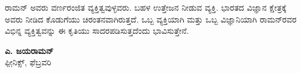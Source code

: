 ರಾಮನ್ ಅವರು ವರ್ಣರಂಜಿತ ವ್ಯಕ್ತಿತ್ವವುಳ್ಳವರು. ಬಹಳ ಉತ್ತೇಜನ ನೀಡುವ ವ್ಯಕ್ತಿ. ಭಾರತದ ವಿಜ್ಞಾನ ಕ್ಷೇತ್ರಕ್ಕೆ ಅವರು ನೀಡಿದ ಕೊಡುಗೆಯು ಚಿರಂತನವಾಗಿರುತ್ತದೆ. ಒಬ್ಬ ವ್ಯಕ್ತಿಯಾಗಿ ಮತ್ತು ಒಬ್ಬ ವಿಜ್ಞಾನಿಯಾಗಿ ರಾಮನ್‍ರವರ ವಿಭಿನ್ನ ವ್ಯಕ್ತಿತ್ವವನ್ನು ಈ ಕೃತಿಯು ಸಾದರಪಡಿಸುತ್ತದೆಂದು ಭಾವಿಸುತ್ತೇನೆ.

\begin{flushright}
\textbf{ಎ. ಜಯರಾಮನ್}\\ಫೀ಼ನಿಕ್ಸ್, ಫೆಬ್ರವರಿ 
\end{flushright}

